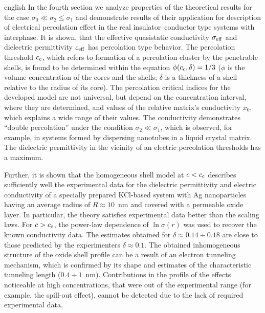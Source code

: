 \begin{otherlanguage*}{english}
In the fourth section we analyze properties of the theoretical results for the case $ \sigma_0 \ll \sigma_2 \leq \sigma_1 $ and demonstrate results of their application for description of electrical percolation effect in the real insulator--conductor type systems with interphase.
It is shown, that the effective quasistatic conductivity $ \sigma _ {\rm eff} $ and dielectric permittivity $ \varepsilon _ {\rm eff} $ has percolation type behavior. The percolation threshold $ c _ {\rm c} $, which refers to formation of a percolation cluster by the penetrable shells, is found to be determined within the equation $ \phi (c _ {\rm c}, \delta) = 1/3 $ ($ \phi $ is the volume concentration of the cores and the shells; $ \delta $ is a thickness of a shell relative to the radius of its core). 
The percolation critical indices for the developed model are not universal, but depend on the concentration interval, where they are determined, and values of the relative matrix's conductivity $ x_0 $, which explains a wide range of their values. The conductivity demonstrates ``double percolation'' under the condition $ \sigma_2 \ll \sigma_1 $, which is observed, for example, in systems formed by dispersing nanotubes in a liquid crystal matrix.
The dielectric permittivity in the vicinity of an electric percolation thresholds has a maximum.

Further, it is shown that the homogeneous shell model at $ c < c _ {\rm c} $ describes sufficiently well the experimental data for the dielectric permittivity and electric conductivity of a specially prepared KCl-based system with Ag nanoparticles having an average radius of $ R \approx 10 $~nm and covered with a permeable oxide layer.
In particular, the theory satisfies experimental data better than the scaling laws.
For $ c> c _ {\rm c} $, the power-law dependence of $ \ln \sigma (r) $ was used to recover the known conductivity data.
The estimates obtained for $ \delta \approx 0.14 \div 0.18 $ are close to those predicted by the experimenters $ \delta \approx 0.1 $.
The obtained inhomogeneous structure of the oxide shell profile can be a result of an electron tunneling mechanism, which is confirmed by its shape and estimates of the characteristic tunneling length ($ 0.4 \div 1 $~nm).
Contributions in the profile of the effects noticeable at high concentrations, that were out of the experimental range (for example, the spill-out effect), cannot be detected due to the lack of required experimental data.


\end{otherlanguage*}
